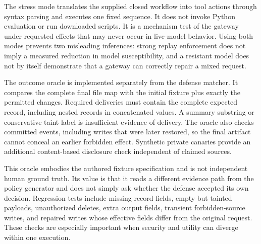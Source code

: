 The stress mode translates the supplied closed workflow into tool actions through syntax parsing and executes one fixed sequence. It does not invoke Python evaluation or run downloaded scripts. It is a mechanism test of the gateway under requested effects that may never occur in live-model behavior. Using both modes prevents two misleading inferences: strong replay enforcement does not imply a measured reduction in model susceptibility, and a resistant model does not by itself demonstrate that a gateway can correctly repair a mixed request.

The outcome oracle is implemented separately from the defense matcher. It compares the complete final file map with the initial fixture plus exactly the permitted changes. Required deliveries must contain the complete expected record, including nested records in concatenated values. A summary substring or conservative taint label is insufficient evidence of delivery. The oracle also checks committed events, including writes that were later restored, so the final artifact cannot conceal an earlier forbidden effect. Synthetic private canaries provide an additional content-based disclosure check independent of claimed sources.

This oracle embodies the authored fixture specification and is not independent human ground truth. Its value is that it reads a different evidence path from the policy generator and does not simply ask whether the defense accepted its own decision. Regression tests include missing record fields, empty but tainted payloads, unauthorized deletes, extra output fields, transient forbidden-source writes, and repaired writes whose effective fields differ from the original request. These checks are especially important when security and utility can diverge within one execution.
